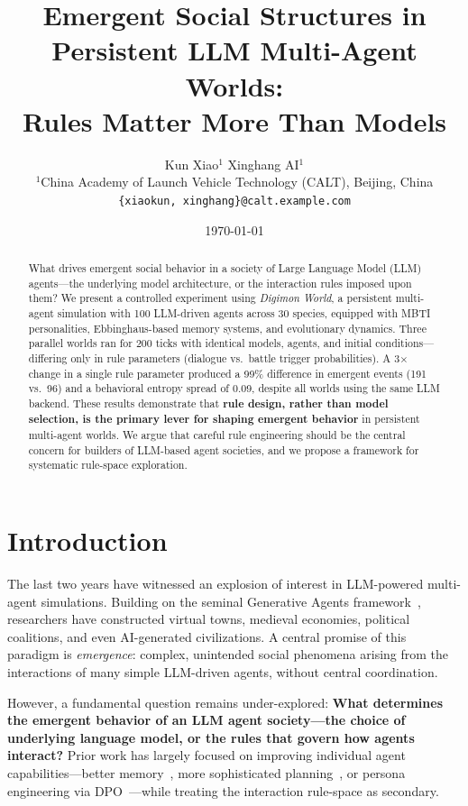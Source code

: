 \documentclass[11pt]{article}
\title{\bfseries Emergent Social Structures in Persistent LLM Multi-Agent Worlds:\\
       Rules Matter More Than Models}
\author{
  Kun Xiao$^{1}$ \quad Xinghang AI$^{1}$ \\
  \small $^{1}$China Academy of Launch Vehicle Technology (CALT), Beijing, China \\
  \small \texttt{\{xiaokun, xinghang\}@calt.example.com}
}
\date{\today}
\begin{document}
\maketitle

\begin{abstract}
\noindent
What drives emergent social behavior in a society of Large Language Model (LLM) agents---the underlying model architecture, or the interaction rules imposed upon them?
We present a controlled experiment using \emph{Digimon World}, a persistent multi-agent simulation with 100 LLM-driven agents across 30 species, equipped with MBTI personalities, Ebbinghaus-based memory systems, and evolutionary dynamics.
Three parallel worlds ran for 200 ticks with identical models, agents, and initial conditions---differing only in rule parameters (dialogue vs.\ battle trigger probabilities).
A 3$\times$ change in a single rule parameter produced a 99\% difference in emergent events (191 vs.\ 96) and a behavioral entropy spread of 0.09, despite all worlds using the same LLM backend.
These results demonstrate that \textbf{rule design, rather than model selection, is the primary lever for shaping emergent behavior} in persistent multi-agent worlds.
We argue that careful rule engineering should be the central concern for builders of LLM-based agent societies, and we propose a framework for systematic rule-space exploration.
\end{abstract}

\section{Introduction}
\label{sec:intro}

The last two years have witnessed an explosion of interest in LLM-powered multi-agent simulations.
Building on the seminal Generative Agents framework~\cite{park2023generative}, researchers have constructed virtual towns, medieval economies, political coalitions, and even AI-generated civilizations.
A central promise of this paradigm is \emph{emergence}: complex, unintended social phenomena arising from the interactions of many simple LLM-driven agents, without central coordination.

However, a fundamental question remains under-explored:
\textbf{What determines the emergent behavior of an LLM agent society---the choice of underlying language model, or the rules that govern how agents interact?}
Prior work has largely focused on improving individual agent capabilities---better memory~\cite{wang2026elasticmem}, more sophisticated planning~\cite{li2026supersede}, or persona engineering via DPO~\cite{vanmulders2026digital}---while treating the interaction rule-space as secondary.
\end{document}
